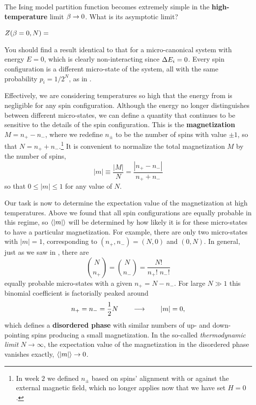 \newpage %
The Ising model partition function becomes extremely simple in the \textbf{high-temperature} limit $\beta \to 0$.
What is its asymptotic limit?
\begin{mdframed}
  $\displaystyle Z(\beta = 0, N) = $ \\[50 pt]
\end{mdframed}
You should find a result identical to that for a micro-canonical system with energy $E = 0$, which is clearly non-interacting since $\Delta E_i = 0$.
Every spin configuration is a different micro-state of the system, all with the same probability $p_i = 1 / 2^N$, as in .

Effectively, we are considering temperatures so high that the energy from  is negligible for any spin configuration.
Although the energy no longer distinguishes between different micro-states, we can define a quantity that continues to be sensitive to the details of the spin configuration.
This is the \textbf{magnetization} $M = n_+ - n_-$, where we redefine $n_{\pm}$ to be the number of spins with value $\pm 1$, so that $N = n_+ + n_-$.\footnote{In week $2$ we defined $n_{\pm}$ based on spins' alignment with or against the external magnetic field, which no longer applies now that we have set $H = 0$.}
It is convenient to normalize the total magnetization $M$ by the number of spins,
\begin{equation}
  \label{eq:Ising_magnet}
  |m| \equiv \frac{|M|}{N} = \frac{|n_+ - n_-|}{n_+ + n_-}
\end{equation}
so that $0 \leq |m| \leq 1$ for any value of $N$.

Our task is now to determine the expectation value of the magnetization at high temperatures.
Above we found that all spin configurations are equally probable in this regime, so $\left\langle |m| \right\rangle$ will be determined by how likely it is for these micro-states to have a particular magnetization.
For example, there are only two micro-states with $|m| = 1$, corresponding to $(n_+, n_-) = (N, 0)$ and $(0, N)$.
In general, just as we saw in , there are
\begin{equation*}
  \binom{N}{n_+} = \binom{N}{n_-} = \frac{N!}{n_+! \; n_-!}
\end{equation*}
equally probable micro-states with a given $n_+ = N - n_-$.
For large $N \gg 1$ this binomial coefficient is factorially peaked around
\begin{equation*}
  n_+ = n_- = \frac{1}{2} N \qquad \longrightarrow \qquad |m| = 0,
\end{equation*}
which defines a \textbf{disordered phase} with similar numbers of up- and down-pointing spins producing a small magnetization.
In the so-called \textit{thermodynamic limit} $N \to \infty$, the expectation value of the magnetization in the disordered phase vanishes exactly, $\left\langle |m| \right\rangle \to 0$.

